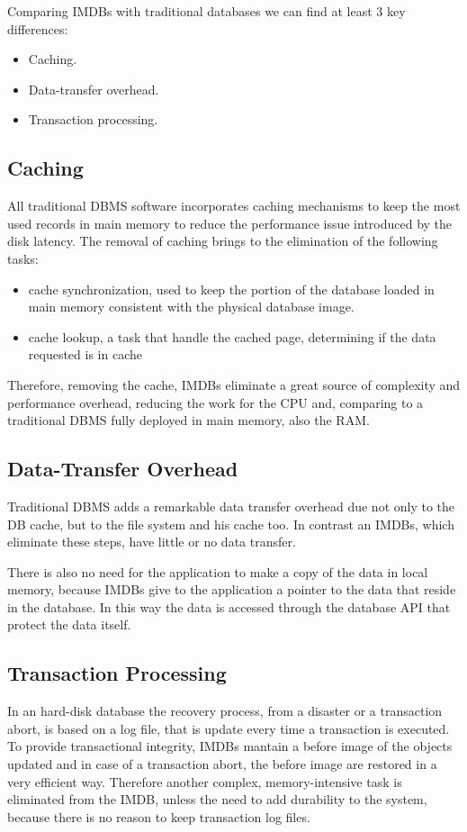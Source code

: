 		Comparing IMDBs with traditional databases we can find at least 3 key 
		differences:	

		\begin{itemize}
			\item Caching.
			\item Data-transfer overhead.
			\item Transaction processing.
		\end{itemize}
			
		\subsection{Caching}
			All traditional DBMS software incorporates caching mechanisms to keep 
			the most used records in main memory to reduce the performance issue 
			introduced by the disk latency. The removal of caching brings to 
			the elimination	of the following tasks:	
					
			\begin{itemize}
				\item cache synchronization, used to keep the portion of the database loaded
				in main memory consistent with the physical database image.
				\item cache lookup, a task that handle the cached page, determining if the
				data requested is in cache
			\end{itemize}
			
			Therefore, removing the cache, IMDBs eliminate a great source of complexity and 
			performance overhead, reducing the work for the CPU and, comparing to a traditional 
			DBMS fully deployed in main memory, also the RAM.
			
		\subsection{Data-Transfer Overhead}
			Traditional DBMS adds a remarkable data transfer overhead due 
			not only to the DB cache, but to the file system and his cache too. 
			In contrast an IMDBs, which eliminate these steps,  have little or no data transfer. 
			
			There is also no need for the application to make a copy of the data in local memory, 
			because IMDBs give to the application a pointer to the data that reside in the database.
			In this way the data is accessed through the database API that protect the data itself.
			
		\subsection{Transaction Processing}
			In an hard-disk database the recovery process, from a disaster or a transaction abort, 
			is based on a log file, that is update every time a transaction is executed.
			To provide transactional integrity, IMDBs mantain a before image of the objects updated and in case 
			of a transaction abort, the before image are restored in a very efficient way.
			Therefore another complex, memory-intensive task is eliminated from the IMDB, 
			unless the need to add durability to the system, because there is no reason 
			to keep transaction log files.
			
